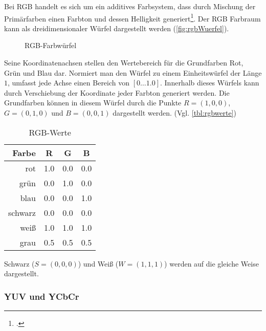 Bei RGB handelt es sich um ein additives Farbsystem, dass durch Mischung der Primärfarben einen Farbton und dessen
 Helligkeit generiert\footcite[Vgl.][S.~233]{burger05}. Der RGB Farbraum kann als dreidimensionaler Würfel dargestellt
 werden (\autoref{fig:rgbWuerfel}).
\begin{figure}[!ht]
	\centering
	\def\svgwidth{.2\columnwidth}
	
	\caption{RGB-Farbwürfel}
	\label{fig:rgbWuerfel}
\end{figure}
Seine Koordinatenachsen stellen den Wertebereich für die Grundfarben Rot, Grün und Blau dar. Normiert man den Würfel zu
 einem Einheitswürfel der Länge $1$, umfasst jede Achse einen Bereich von \(\left[0 \dotsc 1.0\right]\). Innerhalb
 dieses Würfels kann durch Verschiebung der Koordinate jeder Farbton generiert werden. Die Grundfarben können in diesem
 Würfel durch die Punkte $R = \left(1,0,0\right)$, $G = \left(0,1,0\right)$ und $B = \left(0,0,1\right)$ dargestellt
 werden. (Vgl. \autoref{tbl:rgbwerte})
\begin{table}[!ht]
	\begin{center}
	\begin{tabular}[]{r|c|c|c}
	Farbe & R & G & B \\ \hline\hline
	rot & 1.0 & 0.0 & 0.0 \\
	grün & 0.0 & 1.0 & 0.0 \\
	blau & 0.0 & 0.0 & 1.0 \\
	schwarz & 0.0 & 0.0 & 0.0 \\
	weiß & 1.0 & 1.0 & 1.0 \\
	grau & 0.5 & 0.5 & 0.5 \\
	\end{tabular}
	\caption{RGB-Werte}
 	\label{tbl:rgbwerte}
	\end{center}
\end{table}
Schwarz ($S = \left(0,0,0\right)$) und Weiß ($W = \left(1,1,1\right)$) werden auf die gleiche Weise dargestellt.


\subsubsection{YUV und YCbCr} %
\label{sec:yuv_und_ycbcr}

